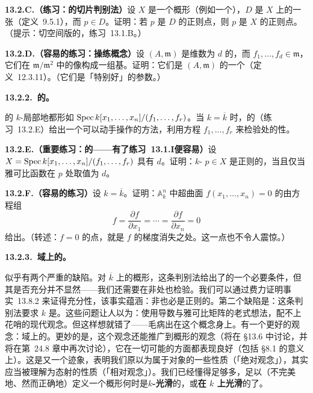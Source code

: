 \textbf{13.2.C.（练习：\trRegularity{}的切片判别法）}\quad 设 $X$ 是一个\trNoetherian{}概形（例如一个\trVariety），$D$ 是 $X$ 上的一张\trEffectiveCartierDivisor（定义~9.5.1），而 $p\in D$。证明：若 $p$ 是 $D$ 的正则点，则 $p$ 是 $X$ 的正则点。（提示：切空间版的\trKrull{}\trPrincipalIdealTheorem，\mbox{练习~13.1.B}。）

\textbf{13.2.D.（容易的练习：操练概念）}\quad 设 $(A,\mathfrak{m})$ 是维数为 $d$ 的\trRegular\trLocalRing，而 $f_1,\dots,f_d\in\mathfrak{m}$，它们在\trVectorSpace{} $\mathfrak{m}/\mathfrak{m}^2$ 中的像构成一组基。证明：它们是 $(A,\mathfrak{m})$ 的一个\trSystemOfParameters（定义~12.3.11）。（它们是「特别好」的参数。）

\textbf{13.2.2.\ \trRegularity{}的\trJacobianCriterion。}

\trFiniteType{}的 $k$-\trScheme{}局部地都形如 $\operatorname{Spec} k[x_1,\dots,x_n]/(f_1,\dots,f_r)$。当 $k=\overline{k}$ 时，\trRegularity{}的\trJacobianCriterion（\mbox{练习~13.2.E}）给出一个可以动手操作的方法，利用方程 $f_1,\dots,f_r$ 来检验\trClosedPoint{}处的\trSingular{}性。

\textbf{13.2.E.（重要练习：\trRegularity{}的\trJacobianCriterion——有了\mbox{练习~13.1.I}便容易）}\quad 设 $X=\operatorname{Spec} k[x_1,\dots,x_n]/(f_1,\dots,f_r)$ 具有\trPureDimension{} $d$。证明：$k$-\trValuedPoint{} $p\in X$ 是正则的，当且仅当雅可比\trCorank{}函数在 $p$ 处取值为 $d$。

\textbf{13.2.F.（容易的练习）}\quad 设 $k=\overline{k}$。证明：$\mathbb{A}^n_k$ 中超曲面 $f(x_1,\dots,x_n)=0$ 的\trSingular\trClosedPoint{}由方程组
\[
f=\frac{\partial f}{\partial x_1}=\cdots=\frac{\partial f}{\partial x_n}=0
\]
给出。（转述：$f=0$ 的\trSingular{}点，就是 $f$ 的梯度消失之处。这一点也不令人震惊。）

\textbf{13.2.3.\ 域上的\trSmoothness。}

\trJacobianCriterion{}似乎有两个严重的缺陷。对 $\overline{k}$ 上的\trFiniteType{}概形，这条判别法给出了\trRegularity{}的一个必要条件，但其是否充分并不显然——我们还需要在非\trClosedPoint{}处也检验\trRegularity。我们可以通过费力证明事实~13.8.2 来证得充分性，该事实蕴涵：非\trClosedPoint{}也必是正则的。第二个缺陷是：这条判别法要求 $k$ 是\trAlgClosedField。这些问题让人以为：使用导数与雅可比矩阵的老式想法，配不上花哨的现代\trRegularity{}观念。但这样想就错了——毛病出在\trRegularity{}这个概念身上。有一个更好的观念：域上的\trSmoothness。更妙的是，这个观念还能推广到概形的\trSmooth\trMorphism{}观念（将在 \S13.6 中讨论，并将在第~24.8 章中再次讨论），它在一切可能的方面都表现良好（包括 \S8.1 的意义上）。这是又一个迹象，表明我们原以为属于对象的一些性质（「绝对观念」），其实应当被理解为态射的性质（「相对观念」）。我们已经懂得足够多，足以（不完美地、然而正确地）定义一个概形何时是\textbf{$k$-光滑}的，或\textbf{在 $k$ 上光滑}的了。

